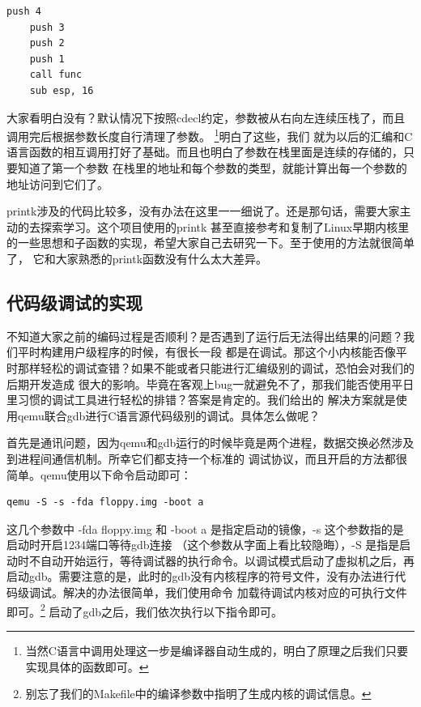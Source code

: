 \begin{lstlisting}[language = {[x86masm]Assembler}, caption = 函数调用]
	push 4
	push 3
	push 2
	push 1
	call func
	sub esp, 16
\end{lstlisting}

\par 大家看明白没有？默认情况下按照cdecl约定，参数被从右向左连续压栈了，而且调用完后根据参数长度自行清理了参数。\allowbreak
\footnote{当然C语言中调用处理这一步是编译器自动生成的，明白了原理之后我们只要实现具体的函数即可。}明白了这些，我们\allowbreak
就为以后的汇编和C语言函数的相互调用打好了基础。而且也明白了参数在栈里面是连续的存储的，只要知道了第一个参数\allowbreak
在栈里的地址和每个参数的类型，就能计算出每一个参数的地址访问到它们了。

\par printk涉及的代码比较多，没有办法在这里一一细说了。还是那句话，需要大家主动的去探索学习。这个项目使用的printk\allowbreak
甚至直接参考和复制了Linux早期内核里的一些思想和子函数的实现，希望大家自己去研究一下。至于使用的方法就很简单了，\allowbreak
它和大家熟悉的printk函数没有什么太大差异。

\subsection{代码级调试的实现}

\par 不知道大家之前的编码过程是否顺利？是否遇到了运行后无法得出结果的问题？我们平时构建用户级程序的时候，有很长一段\allowbreak
都是在调试。那这个小内核能否像平时那样轻松的调试查错？如果不能或者只能进行汇编级别的调试，恐怕会对我们的后期开发造成\allowbreak
很大的影响。毕竟在客观上bug一就避免不了，那我们能否使用平日里习惯的调试工具进行轻松的排错？答案是肯定的。我们给出的\allowbreak
解决方案就是使用qemu联合gdb进行C语言源代码级别的调试。具体怎么做呢？

\par 首先是通讯问题，因为qemu和gdb运行的时候毕竟是两个进程，数据交换必然涉及到进程间通信机制。所幸它们都支持一个标准的\allowbreak
调试协议，而且开启的方法都很简单。qemu使用以下命令启动即可：

\begin{Verbatim}[frame=single]
  qemu -S -s -fda floppy.img -boot a 
\end{Verbatim}

\par 这几个参数中 -fda floppy.img 和 -boot a 是指定启动的镜像，-s 这个参数指的是启动时开启1234端口等待gdb连接\allowbreak
（这个参数从字面上看比较隐晦），-S 是指是启动时不自动开始运行，等待调试器的执行命令。以调试模式启动了虚拟机之后，再\allowbreak
启动gdb。需要注意的是，此时的gdb没有内核程序的符号文件，没有办法进行代码级调试。解决的办法很简单，我们使用命令\allowbreak
加载待调试内核对应的可执行文件即可。\footnote{别忘了我们的Makefile中的编译参数中指明了生成内核的调试信息。}\allowbreak
启动了gdb之后，我们依次执行以下指令即可。


